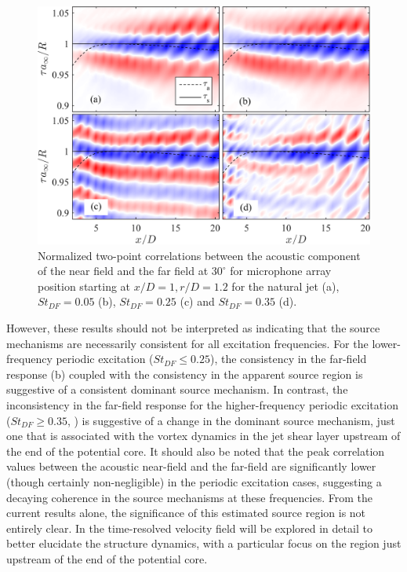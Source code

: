 \begin{figure}
	\centering
	\includegraphics[width=\linewidth]{Figures/sect_nearfield_ffxcorr.png}
	\caption{Normalized two-point correlations between the acoustic component of the near field and the far field at $30^\circ$ for microphone array position starting at $x/D = 1, r/D = 1.2$ for the natural jet (a), $St_{DF} = 0.05$ (b), $St_{DF} = 0.25$ (c) and $St_{DF} = 0.35$ (d).}
	\label{fig:ch3_xcorrOA}
\end{figure}

However, these results should not be interpreted as indicating that the source mechanisms are necessarily consistent for all excitation frequencies. 
For the lower-frequency periodic excitation ($St_{DF} \leq 0.25$), the consistency in the far-field response (b) coupled with the consistency in the apparent source region is suggestive of a consistent dominant source mechanism.
In contrast, the inconsistency in the far-field response for the higher-frequency periodic excitation ($St_{DF} \geq 0.35$, ) is suggestive of a change in the dominant source mechanism, just one that is associated with the vortex dynamics in the jet shear layer upstream of the end of the potential core.
It should also be noted that the peak correlation values between the acoustic near-field and the far-field are significantly lower (though certainly non-negligible) in the periodic excitation cases, suggesting a decaying coherence in the source mechanisms at these frequencies.
From the current results alone, the significance of this estimated source region is not entirely clear.
In  the time-resolved velocity field will be explored in detail to better elucidate the structure dynamics, with a particular focus on the region just upstream of the end of the potential core.

